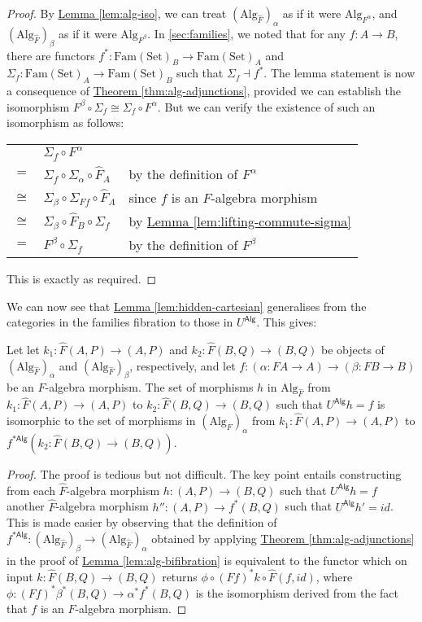 \documentclass{LMCS}
\newcommand{\Fam}{\mathrm{Fam}}
\newcommand{\Set}{\mathrm{Set}}
\newcommand{\Alg}{\mathrm{Alg}}
\newcommand{\palg}{U^{\mathsf{Alg}}}
\newcommand{\reindAlg}{*{\mathsf{Alg}}}
\newcommand{\lemref}[1]{\hyperref[#1]{Lemma \ref*{#1}}}
\newcommand{\thmref}[1]{\hyperref[#1]{Theorem \ref*{#1}}}
\begin{document}
\begin{proof}
  By \lemref{lem:alg-iso}, we can treat $(\Alg_{\hat{F}})_\alpha$ as
  if it were $\Alg_{F^\alpha}$, and $(\Alg_{\hat{F}})_\beta$ as if it
  were $\Alg_{F^\beta}$. In \autoref{sec:families}, we noted that for
  any $f : A \to B$, there are functors $f^* : \Fam(\Set)_B \to
  \Fam(\Set)_A$ and $\Sigma_f : \Fam(\Set)_A \to \Fam(\Set)_B$ such
  that $\Sigma_f \dashv f^*$. The lemma statement is now a consequence
  of \thmref{thm:alg-adjunctions}, provided we can establish the isomorphism
  $F^\beta \circ \Sigma_f \cong \Sigma_f \circ F^\alpha$. But we can
  verify the existence of such an isomorphism as follows: 
  \begin{center}
    \begin{tabular}{cll}
      & $\Sigma_f \circ F^\alpha$ & \\
      $=$     & $\Sigma_f \circ \Sigma_\alpha \circ \hat{F}_A$ & by the
      definition of $F^\alpha$ \\
      $\cong$ & $\Sigma_\beta \circ \Sigma_{Ff} \circ \hat{F}_A$ & since $f$ is an $F$-algebra morphism \\
      $\cong$ & $\Sigma_\beta \circ \hat{F}_B \circ \Sigma_f$ & by \lemref{lem:lifting-commute-sigma} \\
      $=$     & $F^\beta \circ \Sigma_f$ & by the definition of $F^\beta$
    \end{tabular}
  \end{center}
  This is exactly as required.
\end{proof}

We can now see that \lemref{lem:hidden-cartesian} generalises from the
categories in the families fibration to those in $\palg$. This gives:

\begin{lem}\label{lem:hidden-cartesian-alg}
  Let let $k_1 : \hat{F}(A,P) \to (A,P)$ and $k_2 : \hat{F}(B,Q) \to
  (B,Q)$ be objects of $(\Alg_{\hat{F}})_\alpha$ and
  $(\Alg_{\hat{F}})_\beta$, respectively, and let $f : (\alpha : FA
  \to A) \to (\beta : FB \to B)$ be an $F$-algebra morphism. The set
  of morphisms $h$ in $\Alg_{\hat{F}}$ from $k_1 : \hat{F}(A,P) \to
  (A,P)$ to $k_2 : \hat{F}(B,Q) \to (B,Q)$ such that $\palg h = f$ is
  isomorphic to the set of morphisms in $(\Alg_{\hat{F}})_\alpha$ from
  $k_1 : \hat{F}(A,P) \to (A,P)$ to $f^{\reindAlg}(k_2 : \hat{F}(B,Q)
  \to (B,Q))$.
\end{lem}
\begin{proof}
  The proof is tedious but not difficult. The key point entails
  constructing from each $\hat{F}$-algebra morphism $h : (A,P) \to
  (B,Q)$ such that $\palg h = f$ another $\hat{F}$-algebra morphism
  $h'' : (A,P) \to f^*(B,Q)$ such that $\palg h' = id$. This is made
  easier by observing that the definition of $f^{\reindAlg} :
  (\Alg_{\hat{F}})_{\beta} \to (\Alg_{\hat{F}})_{\alpha}$ obtained by
  applying \thmref{thm:alg-adjunctions} in the proof of
  \lemref{lem:alg-bifibration} is equivalent to the functor which on
  input $k : \hat{F}(B,Q) \to (B,Q)$ returns $\phi \circ (Ff)^*k
  \circ \hat{F}(f,\mathit{id})$, where $\phi : (Ff)^*\beta^*(B,Q) \to
  \alpha^* f^* (B,Q)$ is the isomorphism derived from the fact that
  $f$ is an $F$-algebra morphism.
\end{proof}
\end{document}
